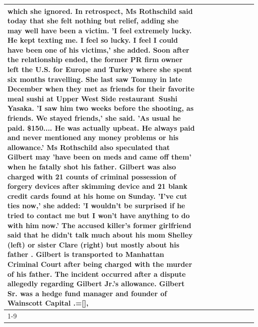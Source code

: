 \begin{table}[H]
\begin{tabular}{lllrlllll}
which she ignored. In retrospect, Ms Rothschild said today that she felt nothing but relief, adding she may well have been a victim. 'I feel extremely lucky. He kept texting me. I feel so lucky. I feel I could have been one of his victims,' she added. Soon after the relationship ended, the former PR firm owner left the U.S. for Europe and Turkey where she spent six months  travelling. She last saw Tommy in late December when they met as friends for their favorite meal sushi at Upper West Side restaurant Sushi Yasaka. 'I saw him two weeks before the shooting, as friends. We stayed friends,' she said. 'As usual he paid. \$150.... He was actually upbeat. He always paid and never mentioned any money problems or his allowance.' Ms Rothschild also speculated that Gilbert may 'have been on meds and came off them' when he fatally shot his father. Gilbert was also charged with 21 counts of criminal possession of forgery devices after skimming device and 21 blank credit cards found at his home on Sunday. 'I've cut ties now,' she added: 'I wouldn’t be surprised if he tried to contact me but I won’t have anything to do with him now.' The accused killer's former girlfriend said that he didn't talk much about his mom Shelley (left) or sister Clare (right) but mostly about his father . Gilbert is transported to Manhattan Criminal Court  after being charged with the murder of his father. The incident occurred after a dispute allegedly regarding Gilbert Jr.'s allowance. Gilbert Sr. was a hedge fund manager and founder of Wainscott Capital .=[], \\
\cline{1-9}

\end{tabular}
\end{table}
